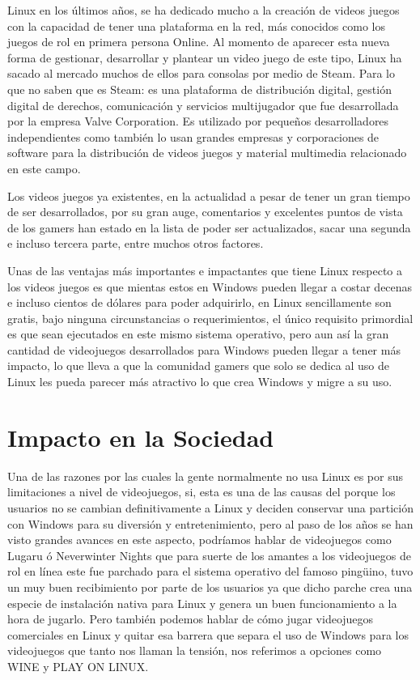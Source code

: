 Linux en los últimos años, se ha dedicado mucho a la creación de videos juegos con la capacidad de tener una plataforma en la red, más conocidos como los juegos de rol en 
primera persona Online. Al momento de aparecer esta nueva forma de gestionar, desarrollar y plantear un video juego de este tipo, Linux ha sacado al mercado muchos de ellos 
para consolas por medio de Steam. Para lo que no saben que es Steam: es una plataforma de distribución digital, gestión digital de derechos, comunicación y servicios 
multijugador que fue desarrollada por la empresa Valve Corporation. Es utilizado por pequeños desarrolladores independientes como también lo usan grandes empresas y 
corporaciones de software para la distribución de videos juegos y material multimedia relacionado en este campo.

Los videos juegos ya existentes, en la actualidad a pesar de tener un gran tiempo de ser desarrollados, por su gran auge, comentarios y excelentes puntos de vista de los 
gamers han estado en la lista de poder ser actualizados, sacar una segunda e incluso tercera parte, entre muchos otros factores.

Unas de las ventajas más importantes e impactantes que tiene Linux respecto a los videos juegos es que mientas estos en Windows pueden llegar a costar decenas e incluso 
cientos de dólares para poder adquirirlo, en Linux sencillamente son gratis, bajo ninguna circunstancias o requerimientos, el único requisito primordial es que sean 
ejecutados en este mismo sistema operativo, pero aun así la gran cantidad de videojuegos desarrollados para Windows pueden llegar a tener más impacto, lo que lleva a que la 
comunidad gamers que solo se dedica al uso de Linux les pueda parecer más atractivo lo que crea Windows y migre a su uso.

\section*{Impacto en la Sociedad}
Una de las razones por las cuales la gente normalmente no usa Linux es por sus limitaciones a nivel de videojuegos, si, esta es una de las causas del porque los usuarios no 
se cambian definitivamente a Linux y deciden conservar una partición con Windows para su diversión y entretenimiento, pero al paso de los años se han visto grandes avances 
en este aspecto, podríamos hablar de videojuegos como Lugaru ó Neverwinter Nights que para suerte de los amantes a los videojuegos de rol en línea este fue parchado para el 
sistema operativo del famoso pingüino, tuvo un muy buen recibimiento por parte de los usuarios ya que dicho parche crea una especie de instalación nativa para Linux y 
genera un buen funcionamiento a la hora de jugarlo. Pero también podemos hablar de cómo jugar videojuegos comerciales en Linux y quitar esa barrera que separa el uso de 
Windows para los videojuegos que tanto nos llaman la tensión, nos referimos a opciones como WINE y PLAY ON LINUX.

